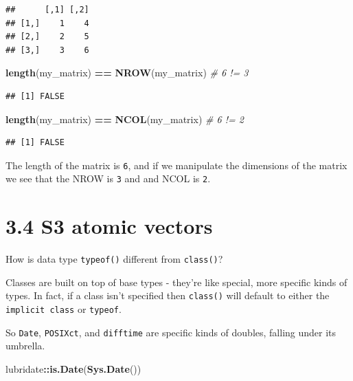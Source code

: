 \documentclass[]{book}
\newenvironment{Shaded}{\begin{snugshade}}{\end{snugshade}}
\newcommand{\CommentTok}[1]{\textcolor[rgb]{0.56,0.35,0.01}{\textit{#1}}}
\newcommand{\KeywordTok}[1]{\textcolor[rgb]{0.13,0.29,0.53}{\textbf{#1}}}
\newcommand{\NormalTok}[1]{#1}
\newcommand{\OperatorTok}[1]{\textcolor[rgb]{0.81,0.36,0.00}{\textbf{#1}}}
\newcommand{\StringTok}[1]{\textcolor[rgb]{0.31,0.60,0.02}{#1}}
\begin{document}
\begin{verbatim}
##      [,1] [,2]
## [1,]    1    4
## [2,]    2    5
## [3,]    3    6
\end{verbatim}

\begin{Shaded}
\begin{Highlighting}[]
\KeywordTok{length}\NormalTok{(my_matrix) }\OperatorTok{==}\StringTok{ }\KeywordTok{NROW}\NormalTok{(my_matrix) }\CommentTok{# 6 != 3}
\end{Highlighting}
\end{Shaded}

\begin{verbatim}
## [1] FALSE
\end{verbatim}

\begin{Shaded}
\begin{Highlighting}[]
\KeywordTok{length}\NormalTok{(my_matrix) }\OperatorTok{==}\StringTok{ }\KeywordTok{NCOL}\NormalTok{(my_matrix) }\CommentTok{# 6 != 2}
\end{Highlighting}
\end{Shaded}

\begin{verbatim}
## [1] FALSE
\end{verbatim}

The length of the matrix is \texttt{6}, and if we manipulate the dimensions of the matrix we see that the NROW is \texttt{3} and and NCOL is \texttt{2}.

\hypertarget{s3-atomic-vectors}{%
\section*{3.4 S3 atomic vectors}\label{s3-atomic-vectors}}

How is data type \texttt{typeof()} different from \texttt{class()}?

Classes are built on top of base types - they're like special, more specific kinds of types. In fact, if a class isn't specified then \texttt{class()} will default to either the \texttt{implicit\ class} or \texttt{typeof}.

So \texttt{Date}, \texttt{POSIXct}, and \texttt{difftime} are specific kinds of doubles, falling under its umbrella.

\begin{Shaded}
\begin{Highlighting}[]
\NormalTok{lubridate}\OperatorTok{::}\KeywordTok{is.Date}\NormalTok{(}\KeywordTok{Sys.Date}\NormalTok{())}
\end{Highlighting}
\end{Shaded}
\end{document}
